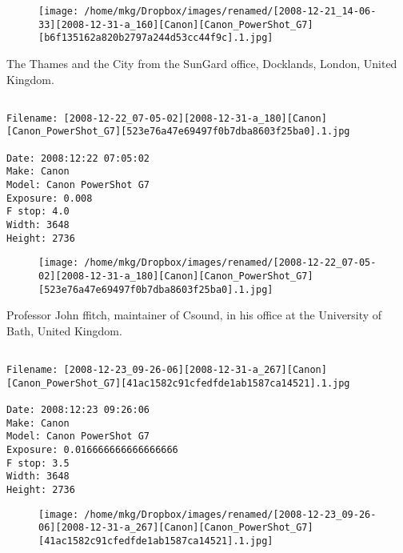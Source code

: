 \begin{figure}
\texttt{[image: /home/mkg/Dropbox/images/renamed/[2008-12-21\_14-06-33][2008-12-31-a\_160][Canon][Canon\_PowerShot\_G7][b6f135162a820b2797a244d53cc44f9c].1.jpg]}
\end{figure}
    
\clearpage
\onecolumn
\noindent The Thames and the City from the SunGard office, Docklands, London, United Kingdom.
\noindent
\begin{lstlisting}

Filename: [2008-12-22_07-05-02][2008-12-31-a_180][Canon][Canon_PowerShot_G7][523e76a47e69497f0b7dba8603f25ba0].1.jpg

Date: 2008:12:22 07:05:02
Make: Canon
Model: Canon PowerShot G7
Exposure: 0.008
F stop: 4.0
Width: 3648
Height: 2736
\end{lstlisting}
\clearpage

\begin{figure}
\texttt{[image: /home/mkg/Dropbox/images/renamed/[2008-12-22\_07-05-02][2008-12-31-a\_180][Canon][Canon\_PowerShot\_G7][523e76a47e69497f0b7dba8603f25ba0].1.jpg]}
\end{figure}
    
\clearpage
\onecolumn
\noindent Professor John ffitch, maintainer of Csound, in his office at the University of Bath, United Kingdom.
\noindent
\begin{lstlisting}

Filename: [2008-12-23_09-26-06][2008-12-31-a_267][Canon][Canon_PowerShot_G7][41ac1582c91cfedfde1ab1587ca14521].1.jpg

Date: 2008:12:23 09:26:06
Make: Canon
Model: Canon PowerShot G7
Exposure: 0.016666666666666666
F stop: 3.5
Width: 3648
Height: 2736
\end{lstlisting}
\clearpage

\begin{figure}
\texttt{[image: /home/mkg/Dropbox/images/renamed/[2008-12-23\_09-26-06][2008-12-31-a\_267][Canon][Canon\_PowerShot\_G7][41ac1582c91cfedfde1ab1587ca14521].1.jpg]}
\end{figure}
    
